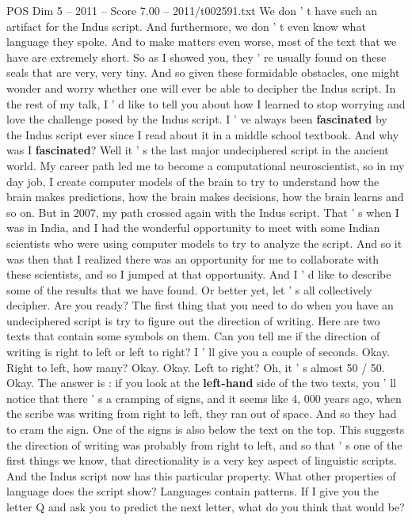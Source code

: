 \begin{textsample}{POS Dim 5 – 2011 – Score 7.00 – 2011/t002591.txt}
We don ' t have such an artifact for the Indus script.
And furthermore, we don ' t even know what language they spoke.
And to make matters even worse, most of the text that we have are extremely short.
So as I showed you, they ' re usually found on these seals that are very, very tiny.
And so given these formidable obstacles, one might wonder and worry whether one will ever be able to decipher the Indus script.
In the rest of my talk, I ' d like to tell you about how I learned to stop worrying and love the challenge posed by the Indus script.
I ' ve always been \textbf{fascinated} by the Indus script ever since I read about it in a middle school textbook.
And why was I \textbf{fascinated}?
Well it ' s the last major undeciphered script in the ancient world.
My career path led me to become a computational neuroscientist, so in my day job, I create computer models of the brain to try to understand how the brain makes predictions, how the brain makes decisions, how the brain learns and so on.
But in 2007, my path crossed again with the Indus script.
That ' s when I was in India, and I had the wonderful opportunity to meet with some Indian scientists who were using computer models to try to analyze the script.
And so it was then that I realized there was an opportunity for me to collaborate with these scientists, and so I jumped at that opportunity.
And I ' d like to describe some of the results that we have found.
Or better yet, let ' s all collectively decipher.
Are you ready?
The first thing that you need to do when you have an undeciphered script is try to figure out the direction of writing.
Here are two texts that contain some symbols on them.
Can you tell me if the direction of writing is right to left or left to right?
I ' ll give you a couple of seconds.
Okay.
Right to left, how many?
Okay.
Okay.
Left to right?
Oh, it ' s almost 50 / 50.
Okay.
The answer is : if you look at the \textbf{left-hand} side of the two texts, you ' ll notice that there ' s a cramping of signs, and it seems like 4, 000 years ago, when the scribe was writing from right to left, they ran out of space.
And so they had to cram the sign.
One of the signs is also below the text on the top.
This suggests the direction of writing was probably from right to left, and so that ' s one of the first things we know, that directionality is a very key aspect of linguistic scripts.
And the Indus script now has this particular property.
What other properties of language does the script show?
Languages contain patterns.
If I give you the letter Q and ask you to predict the next letter, what do you think that would be?

\end{textsample}
